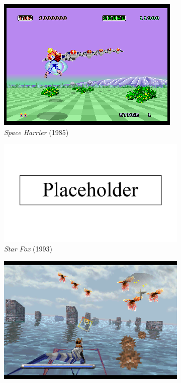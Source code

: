 \documentclass[11pt]{article}
\begin{document}
\begin{figure}[h]
\begin{subfigure}{.5\textwidth}
  \centering
  \includegraphics[width=.8\linewidth]{spaceharrier}
  \caption{\textit{Space Harrier} (1985)}
  \label{fig:sfig1}
\end{subfigure}
\begin{subfigure}{.5\textwidth}
  \centering
  \includegraphics[width=.8\linewidth]{placeholder}
  \caption{\textit{Star Fox} (1993)}
  \label{fig:sfig2}
\end{subfigure}
\begin{subfigure}{.5\textwidth}
  \centering
  \includegraphics[width=.8\linewidth]{panzerdragoon}

\end{subfigure}
\end{figure}
\end{document}

